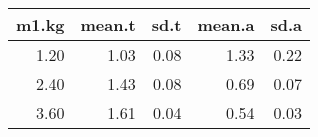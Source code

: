 \begin{table}[ht]
\centering
\begin{tabular}{rrrrr}
  \hline
m1.kg & mean.t & sd.t & mean.a & sd.a \\ 
  \hline
1.20 & 1.03 & 0.08 & 1.33 & 0.22 \\ 
  2.40 & 1.43 & 0.08 & 0.69 & 0.07 \\ 
  3.60 & 1.61 & 0.04 & 0.54 & 0.03 \\ 
   \hline
\end{tabular}
\end{table}
